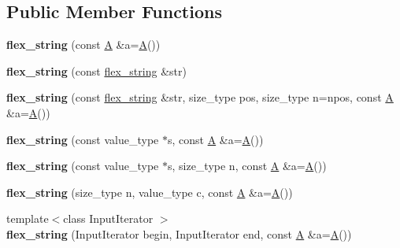 \subsection*{Public Member Functions}
\begin{DoxyCompactItemize}
\item 
\hypertarget{classflex__string_a27220a92152bbfcc209f9ee0cf4dffcc}{}{\bfseries flex\+\_\+string} (const \hyperlink{structA}{A} \&a=\hyperlink{structA}{A}())\label{classflex__string_a27220a92152bbfcc209f9ee0cf4dffcc}

\item 
\hypertarget{classflex__string_adf6e3072ea35c2e80adfd932b72467c7}{}{\bfseries flex\+\_\+string} (const \hyperlink{classflex__string}{flex\+\_\+string} \&str)\label{classflex__string_adf6e3072ea35c2e80adfd932b72467c7}

\item 
\hypertarget{classflex__string_a9ffee10331b94d45db23a6dbfd774c2d}{}{\bfseries flex\+\_\+string} (const \hyperlink{classflex__string}{flex\+\_\+string} \&str, size\+\_\+type pos, size\+\_\+type n=npos, const \hyperlink{structA}{A} \&a=\hyperlink{structA}{A}())\label{classflex__string_a9ffee10331b94d45db23a6dbfd774c2d}

\item 
\hypertarget{classflex__string_a12d7418707c9d7b5f250f6d9ec94f814}{}{\bfseries flex\+\_\+string} (const value\+\_\+type $\ast$s, const \hyperlink{structA}{A} \&a=\hyperlink{structA}{A}())\label{classflex__string_a12d7418707c9d7b5f250f6d9ec94f814}

\item 
\hypertarget{classflex__string_a6f7ace824d1078c45093a2ca6a9cdf65}{}{\bfseries flex\+\_\+string} (const value\+\_\+type $\ast$s, size\+\_\+type n, const \hyperlink{structA}{A} \&a=\hyperlink{structA}{A}())\label{classflex__string_a6f7ace824d1078c45093a2ca6a9cdf65}

\item 
\hypertarget{classflex__string_a024c0a3e46057274094a804558925aa4}{}{\bfseries flex\+\_\+string} (size\+\_\+type n, value\+\_\+type c, const \hyperlink{structA}{A} \&a=\hyperlink{structA}{A}())\label{classflex__string_a024c0a3e46057274094a804558925aa4}

\item 
\hypertarget{classflex__string_a73d09be00e3286cf5e91483bcd0ce111}{}{\footnotesize template$<$class Input\+Iterator $>$ }\\{\bfseries flex\+\_\+string} (Input\+Iterator begin, Input\+Iterator end, const \hyperlink{structA}{A} \&a=\hyperlink{structA}{A}())\label{classflex__string_a73d09be00e3286cf5e91483bcd0ce111}


\end{DoxyCompactItemize}
